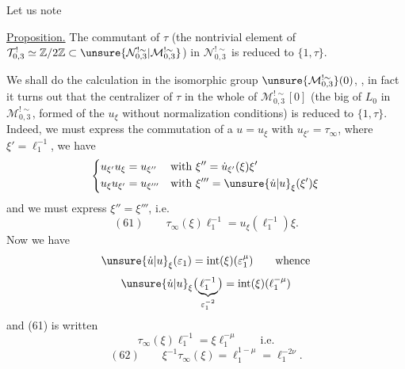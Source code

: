 

Let us note 

\uline{Proposition.} The commutant of $\tau$ (the
nontrivial element of $\mathcal T_{0,3}^{!}\simeq\mathbb Z/2\mathbb Z
\subset\unsure{\mathcal N_{0,3}^{!\sim}|\mathcal M_{0,3}^{!\sim}}$)
in $\mathcal N_{0,3}^{!\sim}$ is reduced to $\{1,\tau\}$.


We shall do the calculation in the isomorphic group
$\unsure{\mathcal M_{0,3}^{!\sim}}(0)$,
,
in fact it turns out that the centralizer of $\tau$ in
the whole of $\mathcal M_{0,3}^{!\sim}[0]$
(the big  of $L_0$ in
$\mathcal M_{0,3}^{!\sim}$, formed of the
$u_{\xi}$ without normalization conditions)
is reduced to $\{1,\tau\}$.
Indeed, we must express the commutation of a
$u=u_{\xi}$ with
$u_{\xi'}=\tau_\infty$,
where $\xi'=\ell_1^{-1}$, we have
\[
\left\{\begin{aligned}
u_{\xi'}u_{\xi}
&=u_{\xi''}
&&\text{with }\xi''=
\dot u_{\xi'}(\xi)\xi'
\\
u_{\xi}u_{\xi'}
&=u_{\xi'''}
&&\text{with }\xi'''=
\unsure{\dot u|u}_{\xi}(\xi')\xi
\end{aligned}\right.
\]
and we must express $\xi''=\xi'''$, i.e.
\[
(61)\qquad
\tau_\infty(\xi)\ell_1^{-1}
=u_{\xi}(\ell_1^{-1})\xi.
\]
Now we have
\[
\unsure{\dot u|u}_{\xi}(\varepsilon_1)
=\mathrm{int}(\xi)(\varepsilon_1^\mu)
\qquad\text{whence}
\]
\[
\unsure{\dot u|u}_{\xi}
\bigl(\underbrace{\ell_1^{-1}}_{\varepsilon_1^{-2}}\bigr)
=\mathrm{int}(\xi)(\ell_1^{-\mu})
\]
and (61) is written
\[
\tau_\infty(\xi)\ell_1^{-1}
=\xi\ell_1^{-\mu}\qquad\text{i.e.}
\]
\[
(62)\qquad
\xi^{-1}\tau_\infty(\xi)
=\ell_1^{1-\mu}=\ell_1^{-2\nu}.
\]
